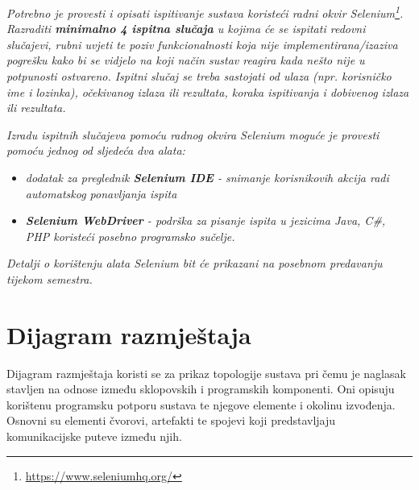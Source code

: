 			 \textit{Potrebno je provesti i opisati ispitivanje sustava koristeći radni okvir Selenium\footnote{\url{https://www.seleniumhq.org/}}. Razraditi \textbf{minimalno 4 ispitna slučaja} u kojima će se ispitati redovni slučajevi, rubni uvjeti te poziv funkcionalnosti koja nije implementirana/izaziva pogrešku kako bi se vidjelo na koji način sustav reagira kada nešto nije u potpunosti ostvareno. Ispitni slučaj se treba sastojati od ulaza (npr. korisničko ime i lozinka), očekivanog izlaza ili rezultata, koraka ispitivanja i dobivenog izlaza ili rezultata.\\ }
			 
			 \textit{Izradu ispitnih slučajeva pomoću radnog okvira Selenium moguće je provesti pomoću jednog od sljedeća dva alata:}
			 \begin{itemize}
			 	\item \textit{dodatak za preglednik \textbf{Selenium IDE} - snimanje korisnikovih akcija radi automatskog ponavljanja ispita	}
			 	\item \textit{\textbf{Selenium WebDriver} - podrška za pisanje ispita u jezicima Java, C\#, PHP koristeći posebno programsko sučelje.}
			 \end{itemize}
		 	\textit{Detalji o korištenju alata Selenium bit će prikazani na posebnom predavanju tijekom semestra.}
			
			\eject 
		
		
		\section{Dijagram razmještaja}
			
			
			 Dijagram razmještaja koristi se za prikaz topologije sustava pri čemu je naglasak stavljen na odnose između sklopovskih i programskih komponenti. Oni opisuju korištenu programsku potporu sustava te njegove elemente i okolinu izvođenja. Osnovni su elementi čvorovi, artefakti te spojevi koji predstavljaju komunikacijske puteve između njih.
			 
